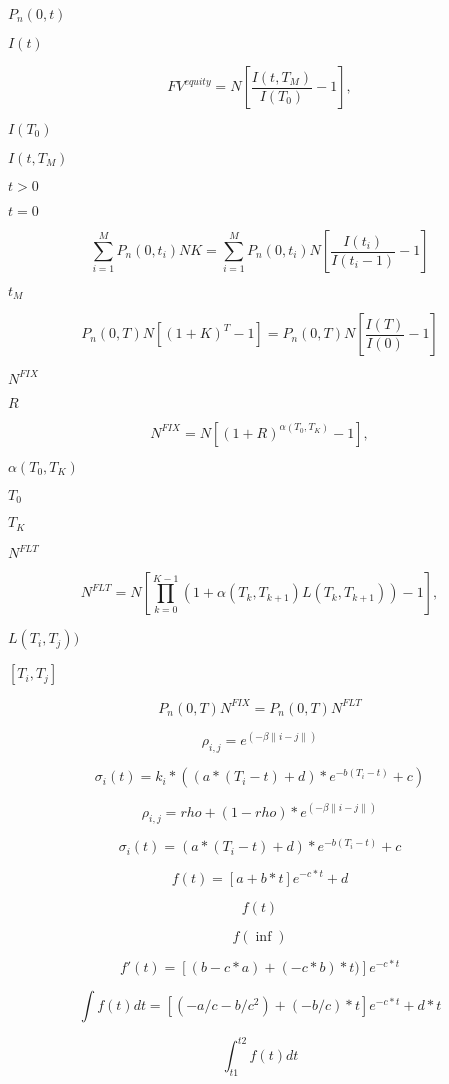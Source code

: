 \documentclass{article}
\begin{document}
$ P_n(0,t) $
\pagebreak

$ I(t) $
\pagebreak

\[FV^{equity} = N \left[ \frac{I(t, T_{M})}{I(T_{0})} -1 \right],
\]
\pagebreak

$ I(T_{0}) $
\pagebreak

$ I(t, T_{M}) $
\pagebreak

$ t>0 $
\pagebreak

$ t=0 $
\pagebreak

\[\sum_{i=1}^{M} P_n(0,t_i) N K =
\sum_{i=1}^{M} P_n(0,t_i) N \left[ \frac{I(t_i)}{I(t_i-1)} - 1 \right]
\]
\pagebreak

$ t_M $
\pagebreak

\[P_n(0,T) N [(1+K)^{T}-1] =
P_n(0,T) N \left[ \frac{I(T)}{I(0)} -1 \right]
\]
\pagebreak

$ N^{FIX} $
\pagebreak

$ R $
\pagebreak

\[N^{FIX} = N \left[ (1+R)^{\alpha(T_{0}, T_{K})}-1 \right] ,
\]
\pagebreak

$ \alpha(T_{0}, T_{K}) $
\pagebreak

$ T_{0} $
\pagebreak

$ T_{K} $
\pagebreak

$ N^{FLT} $
\pagebreak

\[N^{FLT} = N \left[ \prod_{k=0}^{K-1} (1+\alpha(T_{k},T_{k+1})
                   L(T_{k},T_{k+1})) -1 \right],
\]
\pagebreak

$ L(T_{i}, T_{j})) $
\pagebreak

$ [T_{i}, T_{j}] $
\pagebreak

\[P_n(0,T) N^{FIX} = P_n(0,T) N^{FLT}
\]
\pagebreak

\[\rho_{i,j}=e^{(-\beta \|i-j\|)}
\]
\pagebreak

\[\sigma_i(t)=k_i*((a*(T_{i}-t)+d)*e^{-b(T_{i}-t)}+c)
\]
\pagebreak

\[\rho_{i,j}=rho + (1-rho)*e^{(-\beta \|i-j\|)}
\]
\pagebreak

\[\sigma_i(t)=(a*(T_{i}-t)+d)*e^{-b(T_{i}-t)}+c
\]
\pagebreak

\[ f(t) = [ a + b*t ] e^{-c*t} + d \]
\pagebreak

\[ f(t) \]
\pagebreak

\[ f(\inf) \]
\pagebreak

\[ f'(t) = [ (b-c*a) + (-c*b)*t) ] e^{-c*t} \]
\pagebreak

\[ \int f(t)dt = [ (-a/c-b/c^2) + (-b/c)*t ] e^{-c*t} + d*t \]
\pagebreak

\[ \int_{t1}^{t2} f(t)dt \]
\pagebreak
\end{document}
